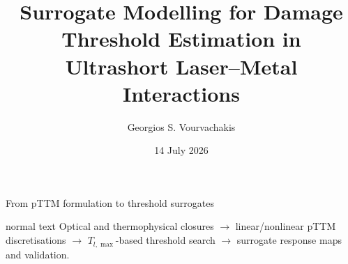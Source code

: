 \documentclass[aspectratio=169,10pt]{beamer}
\title{Surrogate Modelling for Damage\\Threshold Estimation in\\Ultrashort Laser--Metal Interactions}
\author{Georgios S. Vourvachakis}
\date{14 July 2026}
\begin{document}
\GVSetNoFooter
\begin{frame}[plain]
  \GVTitlePage
\end{frame}

\GVSetSource{}
\begin{frame}{From pTTM formulation to threshold surrogates}
  \vfill
  \GVRoadmap
  \vspace{0.55cm}
  \begin{center}
    \begin{beamercolorbox}[wd=0.84\textwidth,sep=0.75em,center]{normal text}
      \color{GVCharcoal}
      Optical and thermophysical closures \(\rightarrow\) linear/nonlinear pTTM discretisations
      \(\rightarrow\) \(T_{l,\max}\)-based threshold search \(\rightarrow\)
      surrogate response maps and validation.
    \end{beamercolorbox}
  \end{center}
  \vfill
\end{frame}
\end{document}

